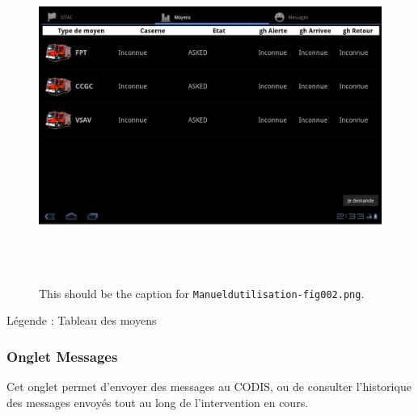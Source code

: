 \documentclass{article}
\begin{document}
\begin{figure}[htbp]
\begin{center}
\includegraphics[width=487pt, height=309pt]{Manueldutilisation-fig002.png}
\caption{This should be the caption for \texttt{Manueldutilisation-fig002.png}.}
\end{center}
\end{figure}

\vspace{27pt}
\begin{center}
{\color{color01} Légende : Tableau des moyens\label{h.2os9qayxrmm5}}
\end{center}

\vspace{41pt}
\subsubsection*{{\color{color02} \textbf{Onglet Messages}}}

{\color{color01} Cet onglet permet d'envoyer des messages au CODIS, ou de consulter 
l'historique des messages envoyés tout au long de l'intervention en cours.}
\end{document}
